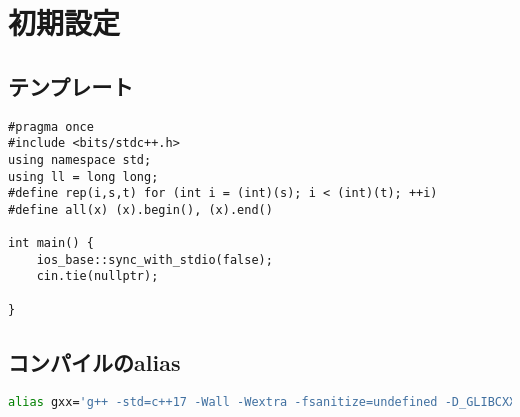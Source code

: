 \section{初期設定}

\subsection{テンプレート}

\begin{lstlisting}
#pragma once
#include <bits/stdc++.h>
using namespace std;
using ll = long long;
#define rep(i,s,t) for (int i = (int)(s); i < (int)(t); ++i)
#define all(x) (x).begin(), (x).end()

int main() {
    ios_base::sync_with_stdio(false);
    cin.tie(nullptr);

}
\end{lstlisting}

\subsection{コンパイルのalias}

\begin{lstlisting}[language=bash]
alias gxx='g++ -std=c++17 -Wall -Wextra -fsanitize=undefined -D_GLIBCXX_DEBUG'
\end{lstlisting}
